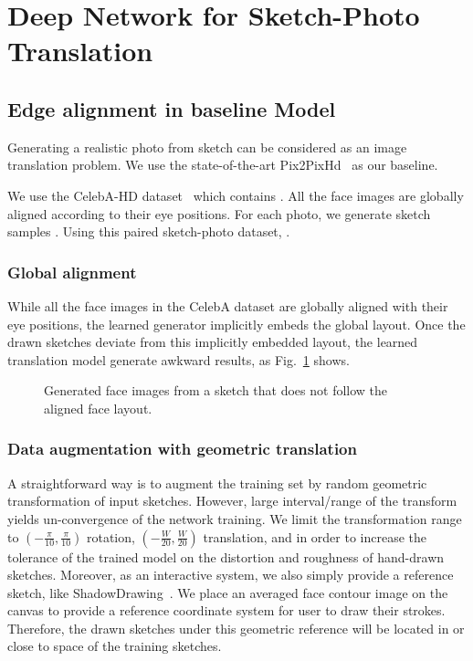 \section{Deep Network for Sketch-Photo Translation}
\label{sec:network}

\subsection{Edge alignment in baseline Model}

Generating a realistic photo from sketch can be considered as an image translation problem. 
We use the state-of-the-art Pix2PixHd~\cite{} as our baseline. 
% 
 
We use the CelebA-HD dataset~\cite{} which contains . All the face images are globally aligned according to their eye positions. 
For each photo, we generate sketch samples .
%
Using this paired sketch-photo dataset, .

\subsubsection{Global alignment}
While all the face images in the CelebA dataset \cite{} are globally aligned with their eye positions, the learned generator implicitly embeds the global layout. Once the drawn sketches deviate from this implicitly embedded layout, the learned translation model generate awkward results, as Fig.~\ref{fig:global-align-fail} shows. 


\begin{figure}
	\centering
	\vspace{1.0cm}
	\caption{Generated face images from a sketch that does not follow the aligned face layout.}
	\label{fig:global-align-fail}
\end{figure}

\subsubsection{Data augmentation with geometric translation}
A straightforward way is to augment the training set by random geometric transformation of input sketches. 
However, large interval/range of the transform yields un-convergence of the network training. 
We limit the transformation range to $(-\frac{\pi}{10},\frac{\pi}{10})$ rotation, $(-\frac{W}{20},\frac{W}{20})$ translation, and  in order to increase the tolerance of the trained model on the distortion and roughness of hand-drawn sketches. 
%
Moreover, as an interactive system, we also simply provide a reference sketch, like ShadowDrawing~\cite{}.
We place an averaged face contour image on the canvas to provide a reference coordinate system for user to draw their strokes. 
Therefore, the drawn sketches under this geometric reference will be located in or close to space of the training sketches.

